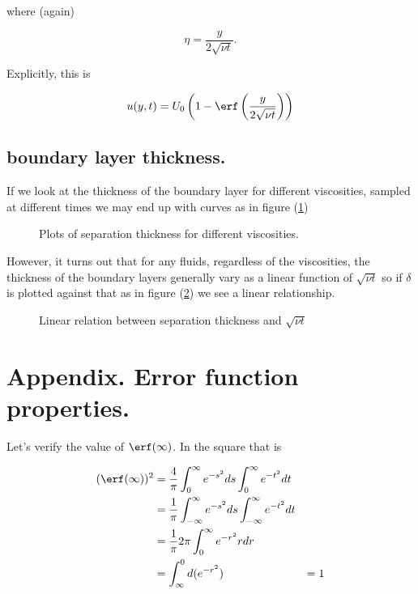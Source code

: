 where (again)

\begin{equation}\label{eqn:continuumL16:610}
\eta = \frac{y}{2 \sqrt{\nu t}}.
\end{equation}

Explicitly, this is

\begin{equation}\label{eqn:continuumL16:590b}
u(y, t) = U_0 \left(1 - \erf\left(\frac{y}{2 \sqrt{\nu t}}\right) \right)
\end{equation}

\subsection{boundary layer thickness.}

If we look at the thickness of the boundary layer for different viscosities, sampled at different times we may end up with curves as in figure (\ref{fig:continuumL16:continuumL16Fig4a})

\begin{figure}[htp]
   \centering
   \def\svgwidth{0.3\columnwidth}
   
   \caption{Plots of separation thickness for different viscosities.}\label{fig:continuumL16:continuumL16Fig4a}
\end{figure}

However, it turns out that for any fluids, regardless of the viscosities, the thickness of the boundary layers generally vary as a linear function of $\sqrt{\nu t}$ so if $\delta$ is plotted against that as in figure (\ref{fig:continuumL16:continuumL16Fig4b}) we see a linear relationship.

\begin{figure}[htp]
   \centering
   \def\svgwidth{0.3\columnwidth}
   
   \caption{Linear relation between separation thickness and $\sqrt{\nu t}$}\label{fig:continuumL16:continuumL16Fig4b}
\end{figure}

\section{Appendix.  Error function properties.}

Let's verify the value of $\erf(\infty)$.  In the square that is

\begin{align*}
(\erf(\infty))^2 
&=
\frac{4}{\pi} 
\int_0^\infty e^{-s^2} ds
\int_0^\infty e^{-t^2} dt \\
&=
\frac{1}{\pi} 
\int_{-\infty}^\infty e^{-s^2} ds
\int_{-\infty}^\infty e^{-t^2} dt \\
&=
\frac{1}{\pi} 2 \pi
\int_{0}^\infty e^{-r^2} r dr \\
&=
\int_\infty^0 d( e^{-r^2} )
&= 1
\end{align*}

\EndArticle
